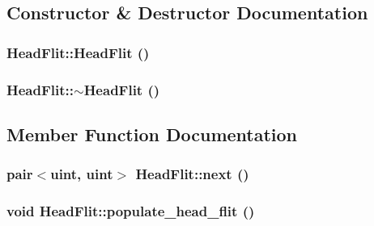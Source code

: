 \subsection{Constructor \& Destructor Documentation}
\hypertarget{classHeadFlit_f7e40d1eb615c1950daec0044e103d14}{
\subsubsection[{HeadFlit}]{\setlength{\rightskip}{0pt plus 5cm}HeadFlit::HeadFlit ()}}
\label{classHeadFlit_f7e40d1eb615c1950daec0044e103d14}


\hypertarget{classHeadFlit_baed314fc6d83dc45b11bc8154de9060}{
\subsubsection[{$\sim$HeadFlit}]{\setlength{\rightskip}{0pt plus 5cm}HeadFlit::$\sim$HeadFlit ()}}
\label{classHeadFlit_baed314fc6d83dc45b11bc8154de9060}




\subsection{Member Function Documentation}
\hypertarget{classHeadFlit_ad973bdd54d38ac2a5ad05e27d3066f1}{
\subsubsection[{next}]{\setlength{\rightskip}{0pt plus 5cm}pair$<${\bf uint}, {\bf uint}$>$ HeadFlit::next ()}}
\label{classHeadFlit_ad973bdd54d38ac2a5ad05e27d3066f1}


\hypertarget{classHeadFlit_6a0b5e2ddf99c2722b2d06ca103707f8}{
\subsubsection[{populate\_\-head\_\-flit}]{\setlength{\rightskip}{0pt plus 5cm}void HeadFlit::populate\_\-head\_\-flit ()}}
\label{classHeadFlit_6a0b5e2ddf99c2722b2d06ca103707f8}


